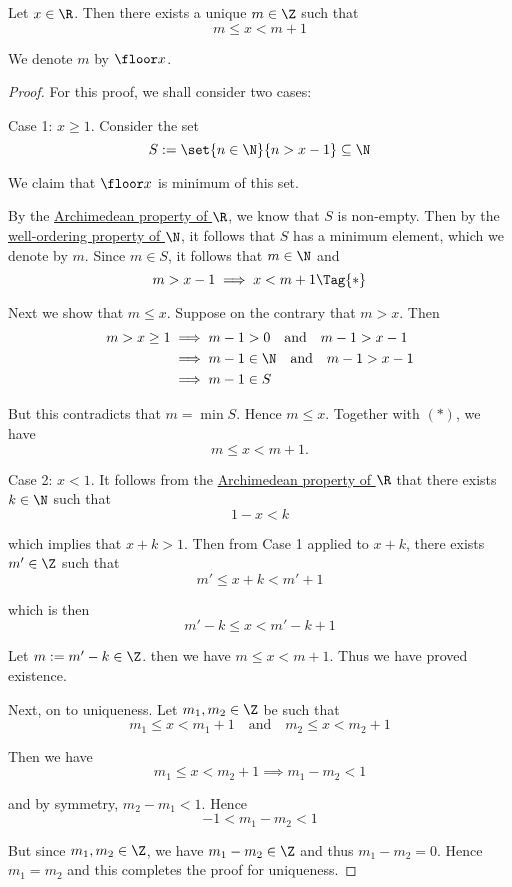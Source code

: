 \label{abc7dbd}

Let $x\in\R$. Then there exists a unique $m\in\Z$ such that
$$
  m\leq x<m+1
$$

We denote $m$ by $\floor x$.

\begin{proof}
  For this proof, we shall consider two cases:

  Case 1: $x\geq 1$. Consider the set
  $$
    S:=\set{n\in\N}{n>x-1}\subseteq\N
  $$

  We claim that $\floor x$ is minimum of this set.

  By the \href{fbc2289}{Archimedean property of $\R$}, we know that $S$ is
  non-empty. Then by the \href{cd7c4d1}{well-ordering property of $\N$}, it
  follows that $S$ has a minimum element, which we denote by $m$. Since $m\in S$,
  it follows that $m\in\N$ and
  \begin{equation*}
    m>x-1\implies x<m+1\Tag{*}
  \end{equation*}

  Next we show that $m\leq x$. Suppose on the contrary that $m>x$. Then
  \begin{align*}
    m>x\geq1
     &\implies m-1>0\quad\text{and}\quad m-1>x-1    \\
     &\implies m-1\in\N\quad\text{and}\quad m-1>x-1 \\
     &\implies m-1\in S
  \end{align*}

  But this contradicts that $m=\min S$. Hence $m\leq x$. Together with $(*)$, we
  have
  $$
    m\leq x<m+1.
  $$

  Case 2: $x<1$. It follows from the \href{fbc2289}{Archimedean property of $\R$}
  that there exists $k\in\N$ such that
  $$
    1-x<k
  $$

  which implies that $x+k>1$. Then from Case 1 applied to $x+k$, there exists
  $m'\in\Z$ such that
  $$
    m'\leq x+k<m'+1
  $$

  which is then
  $$
    m'-k\leq x<m'-k+1
  $$

  Let $m:=m'-k\in\Z$. then we have $m\leq x<m+1$. Thus we have proved existence.

  Next, on to uniqueness. Let $m_1,m_2\in\Z$ be such that
  $$
    m_1\leq x<m_1+1\quad\text{and}\quad m_2\leq x<m_2+1
  $$

  Then we have
  $$
    m_1\leq x<m_2+1 \implies m_1-m_2<1
  $$

  and by symmetry, $m_2-m_1<1$. Hence
  $$
    -1<m_1-m_2<1
  $$

  But since $m_1,m_2\in\Z$, we have $m_1-m_2\in\Z$ and thus $m_1-m_2=0$. Hence
  $m_1=m_2$ and this completes the proof for uniqueness.
\end{proof}

